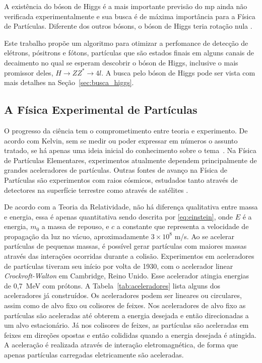 A existência do bóson de Higgs é a mais importante previsão do \gls{mp} 
ainda não verificada experimentalmente e sua busca é de máxima importância para
a Física de Partículas. Diferente dos outros bósons, o
bóson de Higgs teria rotação nula \cite{Intro_Nuclear}.

Este trabalho propõe um algoritmo para otimizar a perfomance de detecção de
elétrons, pósitrons e fótons, partículas que são estados finais em alguns canais de
decaimento no qual se esperam descobrir o bóson de Higgs, inclusive o mais promissor
deles, $H\rightarrow ZZ^*\rightarrow 4l$. 
A busca pelo bóson de Higgs pode ser vista com mais detalhes na Seção~\ref{sec:busca_higgs}.

\subsection{A Física Experimental de Partículas}
\label{ssec:fisexp}

O progresso da ciência tem o comprometimento entre teoria e experimento. De
acordo com Kelvin, sem se medir ou poder expressar em números o assunto tratado, 
se há apenas uma ideia inicial do conhecimento sobre o tema~\cite{kelvin}. 
Na Física de Partículas Elementares, experimentos atualmente dependem
principalmente de grandes aceleradores de partículas. Outras fontes de avanço na
Física de Partículas são experimentos com raios cósmicos, estudados tanto
através de detectores na superfície terrestre como através de satélites 
\cite{nature_space_and_time}. 

De acordo com a Teoria da Relatividade, não há diferença qualitativa entre
massa e energia, essa é apenas quantitativa \cite{einstein} sendo descrita por
\ref{eq:einstein}, onde $E$ é a energia, $m_0$ a massa de repouso, e $c$ a constante que representa a
velocidade de propagação da luz no vácuo, aproximadamente $3\times10^{8}$ m/s. Ao se acelerar
partículas de pequenas massas, é possível gerar partículas com maiores massas
através das interações ocorridas durante a colisão. Experimentos em
aceleradores de partículas tiveram seu início por volta de 1930, com o
acelerador linear \emph{Crockroft-Walton} em Cambridge, Reino Unido. Esse
acelerador atingia energias de 0,7~MeV com prótons. A Tabela~\ref{tab:aceleradores} 
lista alguns dos aceleradores já construídos. Os
aceleradores podem ser lineares ou circulares, assim como de alvo fixo ou colisores
de feixes. Nos aceleradores de alvo fixo as partículas são aceleradas até
obterem a energia desejada e então direcionadas a um alvo estacionário. Já nos
colisores de feixes, as partículas são aceleradas em feixes em direções
opostas e então colididas quando a energia desejada é atingida. A aceleração é
realizada através de interação eletromagnética, de forma que apenas
partículas carregadas eletricamente são aceleradas.


